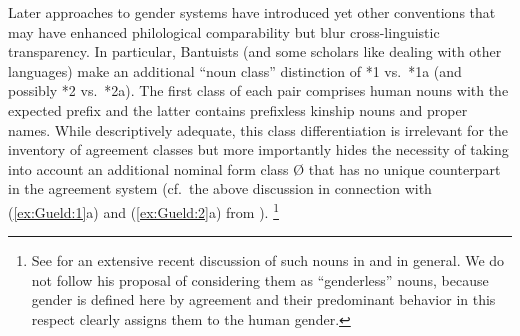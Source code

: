 \documentclass[output=collectionpaper]{langsci/langscibook}
\begin{document}
Later approaches to  gender systems have introduced yet other conventions that may have enhanced philological comparability but blur cross-linguistic transparency. In particular, Bantuists (and some scholars like \citet[166]{Welmers1973} dealing with other  languages) make an additional ``noun class'' distinction of *1 vs.\ *1a (and possibly *2 vs.\ *2a). The first class of each pair comprises human nouns with the expected prefix and the latter contains prefixless kinship nouns and proper names. While descriptively adequate, this class differentiation is irrelevant for the inventory of agreement classes but more importantly hides the necessity of taking into account an additional nominal form class Ø that has no unique counterpart in the agreement system (cf.\ the above discussion in connection with (\ref{ex:Gueld:1}a) and (\ref{ex:Gueld:2}a) from ).%
\footnote{See \citet{VandeVelde2006} for an extensive recent discussion of such nouns in  and  in general. We do not follow his proposal of considering them as ``genderless'' nouns, because gender is defined here by agreement and their predominant behavior in this respect clearly assigns them to the human gender.}
\end{document}
